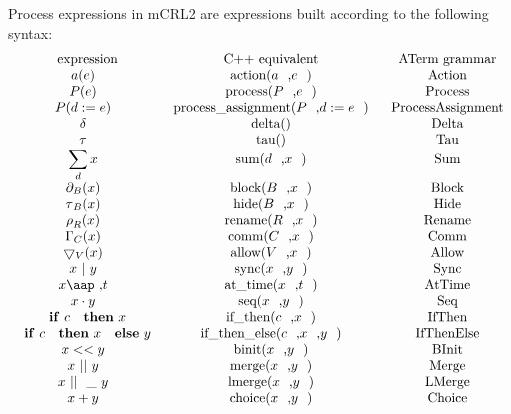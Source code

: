 \documentclass{article}
\begin{document}
Process expressions in mCRL2 are expressions built according to the
following syntax:%
\[
\begin{array}{ccc}
\text{expression} & \text{C++ equivalent} & \text{ATerm grammar} \\ 
a(e) & \text{action(}a\text{,}e\text{)} & \text{Action} \\ 
P(e) & \text{process(}P\text{,}e\text{)} & \text{Process} \\ 
P(d:=e) & \text{process\_assignment(}P\text{,}d:=e\text{)} & \text{%
ProcessAssignment} \\ 
\delta  & \text{delta()} & \text{Delta} \\ 
\tau  & \text{tau()} & \text{Tau} \\ 
\dsum\limits_{d}x & \text{sum(}d\text{,}x\text{)} & \text{Sum} \\ 
\partial _{B}(x) & \text{block(}B\text{,}x\text{)} & \text{Block} \\ 
\tau _{B}(x) & \text{hide(}B\text{,}x\text{)} & \text{Hide} \\ 
\rho _{R}(x) & \text{rename(}R\text{,}x\text{)} & \text{Rename} \\ 
\Gamma _{C}(x) & \text{comm(}C\text{,}x\text{)} & \text{Comm} \\ 
\bigtriangledown _{V}(x) & \text{allow(}V\text{,}x\text{)} & \text{Allow} \\ 
x\ |\ y & \text{sync(}x\text{,}y\text{)} & \text{Sync} \\ 
x\mbox{\aap ,}t & \text{at\_time(}x\text{,}t\text{)} & \text{AtTime} \\ 
x\cdot y & \text{seq(}x\text{,}y\text{)} & \text{Seq} \\ 
\text{\textbf{if} }c\text{ \textbf{then} }x & \text{if\_then(}c\text{,}x%
\text{)} & \text{IfThen} \\ 
\text{\textbf{if} }c\text{ \textbf{then} }x\text{ \textbf{else} }y & \text{%
if\_then\_else(}c\text{,}x\text{,}y\text{)} & \text{IfThenElse} \\ 
x<<y & \text{binit(}x\text{,}y\text{)} & \text{BInit} \\ 
x\ ||\ y & \text{merge(}x\text{,}y\text{)} & \text{Merge} \\ 
x\ ||\_\ y & \text{lmerge(}x\text{,}y\text{)} & \text{LMerge} \\ 
x+y & \text{choice(}x\text{,}y\text{)} & \text{Choice}%
\end{array}%
\]
\end{document}
